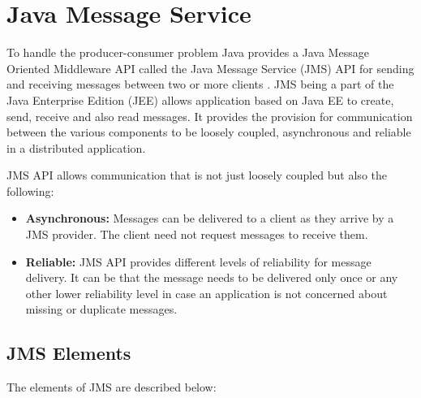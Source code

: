\section{Java Message Service}

To handle the producer-consumer problem Java provides a Java Message Oriented Middleware API called the Java Message Service (JMS) API for sending and receiving messages between two or more clients \parencite{hapner2002java}.
JMS being a part of the Java Enterprise Edition (JEE) allows application based on Java EE to create, send, receive and also read messages. It provides the provision for communication between the various components to be loosely coupled, asynchronous and reliable in a distributed application. 

JMS API allows communication that is not just loosely coupled but also the following:

\begin{itemize}
    \item \textbf{Asynchronous:}
          Messages can be delivered to a client as they arrive by a JMS provider. The client need not request messages to receive them.

    \item \textbf{Reliable:}
          JMS API provides different levels of reliability for message delivery. It can be that the message needs to be delivered only once or any other lower reliability level in case an application is not concerned about missing or duplicate messages.

\end{itemize}

\subsection {JMS Elements}
The elements of JMS are described below:

